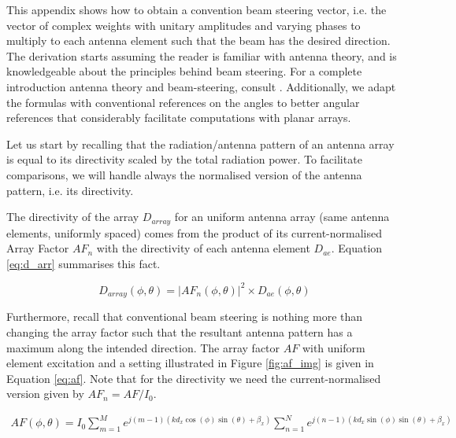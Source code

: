 \label{sec:beam_steering}

This appendix shows how to obtain a convention beam steering vector, i.e. the vector of complex weights with unitary amplitudes and varying phases to multiply to each antenna element such that the beam has the desired direction. The derivation starts assuming the reader is familiar with antenna theory, and is knowledgeable about the principles behind beam steering. For a complete introduction antenna theory and beam-steering, consult \cite{balanis_antennas}. Additionally, we adapt the formulas with conventional references on the angles to better angular references that considerably facilitate computations with planar arrays.

Let us start by recalling that the radiation/antenna pattern of an antenna array is equal to its directivity scaled by the total radiation power. To facilitate comparisons, we will handle always the normalised version of the antenna pattern, i.e. its directivity. 

The directivity of the array $D_{array}$ for an uniform antenna array (same antenna elements, uniformly spaced) comes from the product of its current-normalised Array Factor $AF_n$ with the directivity of each antenna element $D_{ae}$. Equation \eqref{eq:d_arr} summarises this fact.

\begin{equation} \label{eq:d_arr}
    D_{array}(\phi, \theta) = \left|AF_n(\phi, \theta)\right|^2 \times D_{ae}(\phi, \theta)
\end{equation}

Furthermore, recall that conventional beam steering is nothing more than changing the array factor such that the resultant antenna pattern has a maximum along the intended direction. The array factor $AF$ with uniform element excitation and a setting illustrated in Figure \ref{fig:af_img} is given in Equation \eqref{eq:af}. Note that for the directivity we need the current-normalised version given by $AF_n = AF / I_0$.



\begin{align}
    AF(\phi, \theta) = I_0 \sum_{m=1}^{M} e^{j (m-1) \left(k d_x \cos(\phi)\sin(\theta) + \beta_x\right)} \sum_{n=1}^{N} e^{j (n-1) \left(k d_x \sin(\phi)\sin(\theta) + \beta_x\right)} \label{eq:af}
\end{align}


